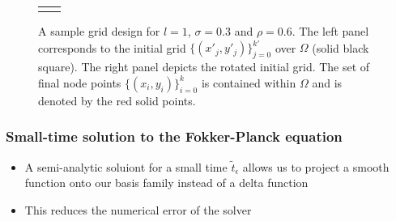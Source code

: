 \documentclass{beamer}
\begin{document}
\begin{frame}
\begin{figure}
\begin{tabular}{cc}
\begin{minipage}{0.4\textwidth}
    \end{minipage}
  \end{tabular}
  \caption{A sample grid design for $l=1$, $\sigma=0.3$ and $\rho=0.6$. The
    left panel corresponds to the initial grid
    $\{ (x'_j,y'_j) \}_{j=0}^{k'}$ over $\Omega$ (solid black
    square). The right panel depicts the rotated initial grid. The set
    of final node points $\{ (x_i,y_i) \}_{i=0}^{k}$ is contained
    within $\Omega$ and is denoted by the red solid points.}
  \label{fig:grids}
\end{figure}
\end{frame}
\begin{frame}
  \frametitle{Small-time solution to the Fokker-Planck equation}
  \begin{itemize}
  \item A semi-analytic soluiont for a small time $\tilde{t}_\epsilon$ allows us to project a smooth function onto our basis family instead of a delta function
  \item This reduces the numerical error of the solver


\end{itemize}
\end{frame}
\end{document}
